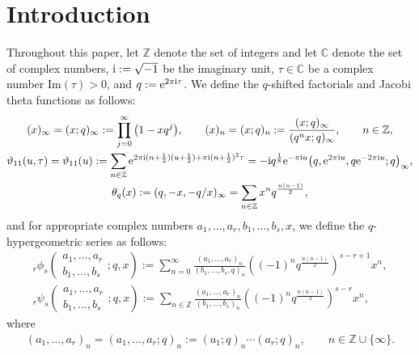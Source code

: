 \documentclass[pdftex]{sigma}
\numberwithin{equation}{section}
\theoremstyle{definition}
\newcommand{\Zz}{\mathbb{Z}}
\newcommand{\Cz}{\mathbb{C}}
\begin{document}
\section{Introduction}
Throughout this paper, let $\Zz$ denote the set of integers and let $\Cz$ denote the set of complex numbers, ${\rm i}:=\sqrt{-1}$ be the imaginary unit, $\tau\in\Cz$ be a complex number $\mathrm{Im}(\tau)>0$, and $q:={\rm e}^{2\pi{\rm i}\tau}$.
We define the $q$-shifted factorials and Jacobi theta functions as follows:
\begin{gather*}
(x)_{\infty }
 =
 (x;q)_{\infty }
 :=
 \prod_{j=0}^{\infty }\big(1-xq^{j}\big), \qquad
 (x)_{n }=(x;q)_{n}:=\frac{(x;q)_{\infty }}{(q^{n}x;q)_{\infty }}, \qquad n \in \mathbb{Z}, \\
\vartheta_{11}(u,\tau)
 =
 \vartheta_{11}(u)
 :=
 \sum_{n\in\Zz}{\rm e}^{2\pi{\rm i}(n+\frac{1}{2})(u+\frac{1}{2})+\pi{\rm i}(n+\frac{1}{2})^2\tau}
 =-{\rm i}q^{\frac{1}{8}}{\rm e}^{-\pi{\rm i}u}\big(q,{\rm e}^{2\pi{\rm i}u}, q{\rm e}^{-2\pi{\rm i}u};q\big)_{\infty }, \\
\theta_q(x)
 :=(q,-x,-q/x)_\infty
 =\sum_{n \in \mathbb{Z}} x^nq^\frac{n(n-1)}{2},
\end{gather*}
and for appropriate complex numbers $a_1,\dots, a_r,b_1,\dots,b_s,x$, we define the $q$-hypergeometric series as follows:
\begin{gather*}
{}_r\phi_{s}\left( \begin{matrix} a_1,\dots,a_r \\ b_1,\dots,b_s \end{matrix};q,x\right)
 :=
 \sum_{n=0}^{\infty }\frac{(a_1,\dots, a_r)_n}{(b_1,\dots,b_s,q)_n}\left((-1)^{n }q^\frac{n(n-1)}{2}\right)^{s-r+1}x^{n }, \\
{}_r\psi_{s}\left( \begin{matrix} a_1,\dots, a_r\\b_1,\dots, b_s\end{matrix};q,x\right)
 :=
 \sum_{n \in \mathbb{Z}}\frac{(a_1,\dots, a_r)_n}{(b_1,\dots, b_s)_n}\left((-1)^{n }q^\frac{n(n-1)}{2}\right)^{s-r}x^{n },
\end{gather*}
where
\begin{gather*}
(a_1,\dots,a_r)_{n }
 =
 (a_1,\dots,a_r;q)_{n }
 :=(a_1;q)_{n}\cdots (a_r;q)_{n}, \qquad n \in \mathbb{Z}\cup \{\infty \}.
\end{gather*}
\end{document}

